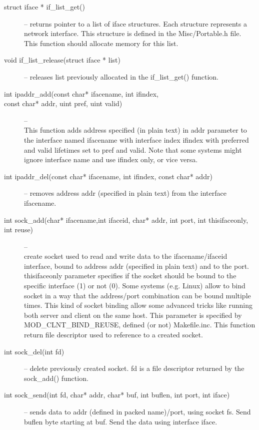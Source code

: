 \begin{description}
\item[struct iface * if\_list\_get()] -- returns pointer to a list of iface
structures. Each structure represents a network interface. This structure is
defined in the Misc/Portable.h file. This function should allocate memory
for this list.

\item[void if\_list\_release(struct iface * list)] -- releases list previously
allocated in the if\_list\_get() function.

\item[int ipaddr\_add(const char* ifacename, int ifindex, \\const char*
	   addr, uint pref, uint valid)] -- \\
This function adds address specified (in plain text) in addr parameter to
the interface named ifacename with interface index ifindex with preferred
and valid lifetimes set to pref and valid. Note that some systems might
ignore interface name and use ifindex only, or vice versa.

\item[int ipaddr\_del(const char* ifacename, int ifindex, const char*
	   addr)] -- removes address addr (specified in plain text) from the interface
ifacename.

\item[int sock\_add(char* ifacename,int ifaceid, char* addr, int port, int
thisifaceonly, int reuse)] -- \\ create socket used to read and write data to
the ifacename/ifaceid interface, bound to address addr (specified in plain
text) and to the port. thisifaceonly parameter specifies if the socket
should be bound to the specific interface (1) or not (0). Some systems (e.g.
Linux) allow to bind socket in a way that the address/port combination can
be bound multiple times. This kind of socket binding allow some advanced
tricks like running both server and client on the same host. This parameter
is specified by MOD\_CLNT\_BIND\_REUSE, defined (or not) Makefile.inc. This
function return file descriptor used to reference to a created socket.

\item[int sock\_del(int fd)] -- delete previously created socket. fd is a
file descriptor returned by the sock\_add() function.

\item[int sock\_send(int fd, char* addr, char* buf, int buflen, int port,
int iface)] -- sends data to addr (defined in packed name)/port, using socket
fs. Send buflen byte starting at buf. Send the data using interface iface.


\end{description}
